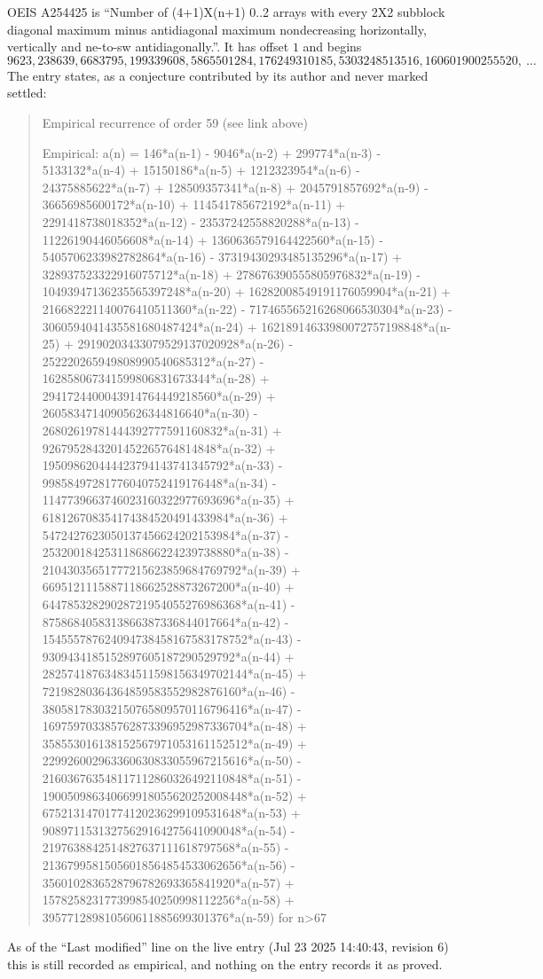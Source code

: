 \documentclass[11pt,a4paper]{article}
\theoremstyle{plain}
\theoremstyle{definition}
\begin{document}
OEIS A254425 is ``Number of (4+1)X(n+1) 0..2 arrays with every 2X2 subblock diagonal maximum minus antidiagonal maximum nondecreasing horizontally, vertically and ne-to-sw antidiagonally.''. It has offset $1$ and begins
\[
9623, 238639, 6683795, 199339608, 5865501284, 176249310185, 5303248513516, 160601900255520,\ \dots
\]
The entry states, as a conjecture contributed by its author and never marked settled:
\begin{quote}
Empirical recurrence of order 59 (see link above)

Empirical: a(n) = 146*a(n-1) - 9046*a(n-2) + 299774*a(n-3) - 5133132*a(n-4) + 15150186*a(n-5) + 1212323954*a(n-6) - 24375885622*a(n-7) + 128509357341*a(n-8) + 2045791857692*a(n-9) - 36656985600172*a(n-10) + 114541785672192*a(n-11) + 2291418738018352*a(n-12) - 23537242558820288*a(n-13) - 11226190446056608*a(n-14) + 1360636579164422560*a(n-15) - 5405706233982782864*a(n-16) - 37319430293485135296*a(n-17) + 328937523322916075712*a(n-18) + 278676390555805976832*a(n-19) - 10493947136235565397248*a(n-20) + 16282008549191176059904*a(n-21) + 216682221140076410511360*a(n-22) - 717465565216268066530304*a(n-23) - 3060594041435581680487424*a(n-24) + 16218914633980072757198848*a(n-25) + 29190203433079529137020928*a(n-26) - 252220265949808990540685312*a(n-27) - 162858067341599806831673344*a(n-28) + 2941724400043914764449218560*a(n-29) + 26058347140905626344816640*a(n-30) - 26802619781444392777591160832*a(n-31) + 9267952843201452265764814848*a(n-32) + 195098620444423794143741345792*a(n-33) - 99858497281776040752419176448*a(n-34) - 1147739663746023160322977693696*a(n-35) + 618126708354174384520491433984*a(n-36) + 5472427623050137456624202153984*a(n-37) - 2532001842531186866224239738880*a(n-38) - 21043035651777215623859684769792*a(n-39) + 6695121115887118662528873267200*a(n-40) + 64478532829028721954055276986368*a(n-41) - 8758684058313866387336844017664*a(n-42) - 154555787624094738458167583178752*a(n-43) - 9309434185152897605187290529792*a(n-44) + 282574187634834511598156349702144*a(n-45) + 72198280364364859583552982876160*a(n-46) - 380581783032150765809570116796416*a(n-47) - 169759703385762873396952987336704*a(n-48) + 358553016138152567971053161152512*a(n-49) + 229926002963360630833055967215616*a(n-50) - 216036763548117112860326492110848*a(n-51) - 190050986340669918055620252008448*a(n-52) + 67521314701774120236299109531648*a(n-53) + 90897115313275629164275641090048*a(n-54) - 2197638842514827637111618797568*a(n-55) - 21367995815056018564854533062656*a(n-56) - 3560102836528796782693365841920*a(n-57) + 1578258231773998540250998112256*a(n-58) + 395771289810560611885699301376*a(n-59) for n>67
\end{quote}
As of the ``Last modified'' line on the live entry (Jul 23 2025 14:40:43, revision 6) this is still
recorded as empirical, and nothing on the entry records it as proved.
\end{document}
